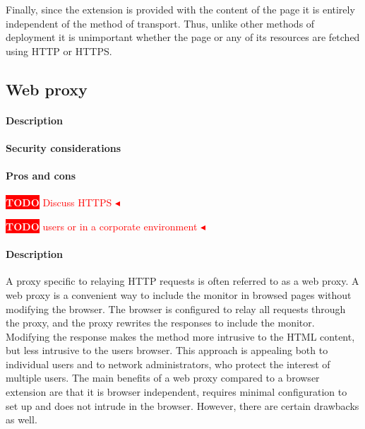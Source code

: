 \documentclass{llncs}
\newcommand{\todo}[1]{\colorbox{red}{\textcolor{white}{\sffamily\bfseries\scriptsize TODO}} \textcolor{red}{#1} \textcolor{red}{$\blacktriangleleft$}}
\begin{document}
Finally, since the extension is provided with the content of the page it is
entirely independent of the method of transport. Thus, unlike other methods of
deployment it is unimportant whether the page or any of its resources are
fetched using HTTP or HTTPS.



\subsection{Web proxy}

\paragraph{Description}

\paragraph{Security considerations}

\paragraph{Pros and cons}

\todo{Discuss HTTPS}



\todo{users or in a corporate environment}

\paragraph{Description}
A proxy specific to relaying HTTP requests is often referred to as a web proxy.
A web proxy is a convenient way to include the monitor in browsed pages without 
modifying the browser. The browser is configured to relay 
all requests through the proxy, and the proxy rewrites the responses to include 
the monitor. Modifying the response makes the method more 
intrusive to the HTML content, but less intrusive to the users browser. 
This approach is appealing both to individual users and to network 
administrators, who protect the interest of multiple users. The main benefits of 
a web proxy compared to a browser extension are that it is browser independent, requires 
minimal configuration to set up and does not intrude in the browser. However, there 
are certain drawbacks as well. 
%
\end{document}
